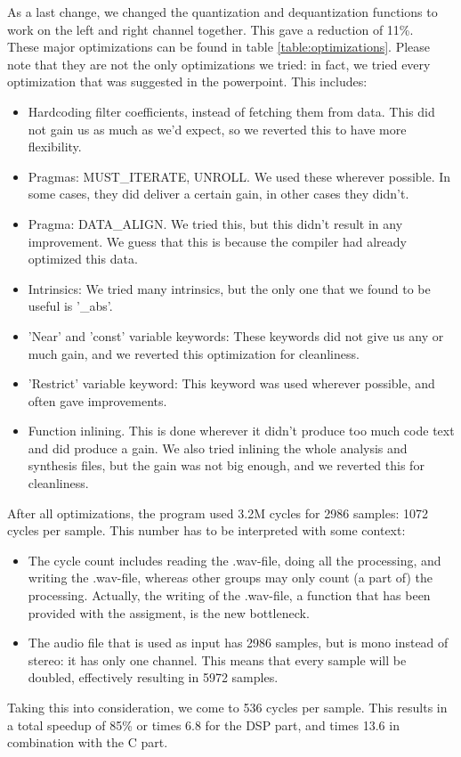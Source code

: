 \documentclass[a4paper]{article}
\begin{document}
As a last change, we changed the quantization and dequantization functions to work on the left and right channel together. This gave a reduction of 11\%.\\
These major optimizations can be found in table \ref{table:optimizations}. Please note that they are not the only optimizations we tried: in fact, we tried every optimization that was suggested in the powerpoint. This includes:
\begin{itemize}
\item Hardcoding filter coefficients, instead of fetching them from data. This did not gain us as much as we'd expect, so we reverted this to have more flexibility.
\item Pragmas: MUST\_ITERATE, UNROLL. We used these wherever possible. In some cases, they did deliver a certain gain, in other cases they didn't.
\item Pragma: DATA\_ALIGN. We tried this, but this didn't result in any improvement. We guess that this is because the compiler had already optimized this data.
\item Intrinsics: We tried many intrinsics, but the only one that we found to be useful is '\_abs'.
\item 'Near' and 'const' variable keywords: These keywords did not give us any or much gain, and we reverted this optimization for cleanliness.
\item 'Restrict' variable keyword: This keyword was used wherever possible, and often gave improvements.
\item Function inlining. This is done wherever it didn't produce too much code text and did produce a gain. We also tried inlining the whole analysis and synthesis files, but the gain was not big enough, and we reverted this for cleanliness.
\end{itemize}

After all optimizations, the program used 3.2M cycles for 2986 samples: 1072 cycles per sample. This number has to be interpreted with some context:
\begin{itemize}
\item The cycle count includes reading the .wav-file, doing all the processing, and writing the .wav-file, whereas other groups may only count (a part of) the processing. Actually, the writing of the .wav-file, a function that has been provided with the assigment, is the new bottleneck.
\item The audio file that is used as input has 2986 samples, but is mono instead of stereo: it has only one channel. This means that every sample will be doubled, effectively resulting in 5972 samples.
\end{itemize}
Taking this into consideration, we come to 536 cycles per sample. This results in a total speedup of 85\% or times 6.8 for the DSP part, and times 13.6 in combination with the C part.\\
\end{document}
